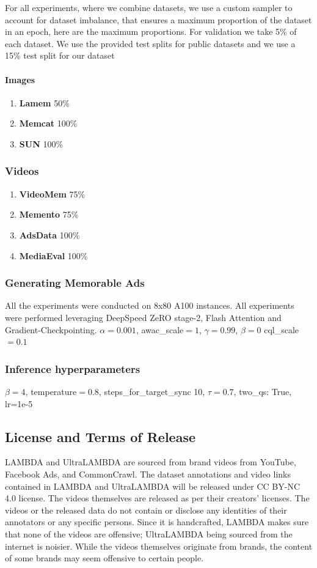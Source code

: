 For all experiments, where we combine datasets, we use a custom sampler to account for dataset imbalance, that ensures a maximum proportion of the dataset in an epoch, here are the maximum proportions. For validation we take 5\% of each dataset.
We use the provided test splits for public datasets and we use a 15\% test split for our dataset

\paragraph{Images}
\begin{enumerate}
    \item \textbf{Lamem} 50\%
    \item \textbf{Memcat} 100\%
    \item \textbf{SUN} 100\%
\end{enumerate}

\subsubsection{Videos}
\begin{enumerate}
    \item \textbf{VideoMem} 75\%
    \item \textbf{Memento} 75\%
    \item \textbf{AdsData} 100\%
    \item \textbf{MediaEval} 100\%
\end{enumerate}

\subsubsection{Generating Memorable Ads}
All the experiments were conducted on 8x80 A100 instances. All experiments were performed leveraging DeepSpeed ZeRO stage-2, Flash Attention and Gradient-Checkpointing.
$\alpha=0.001$, awac\_scale$=1$, $\gamma=0.99$, $\beta=0$ cql\_scale$=0.1$
\subsubsection{Inference hyperparameters}
$\beta=4$, temperature$=0.8$, steps\_for\_target\_sync 10, 
$\tau=0.7$, two\_qs: True, lr=1e-5


\subsection{License and Terms of Release}
LAMBDA and UltraLAMBDA are sourced from brand videos from YouTube, Facebook Ads, and CommonCrawl. The dataset annotations and video links contained in LAMBDA and UltraLAMBDA will be released under CC BY-NC 4.0 license. The videos themselves are released as per their creators' licenses. The videos or the released data do not contain or disclose any identities of their annotators or any specific persons. Since it is handcrafted, LAMBDA makes sure that none of the videos are offensive; UltraLAMBDA being sourced from the internet is noisier. While the videos themselves originate from brands, the content of some brands may seem offensive to certain people. 


